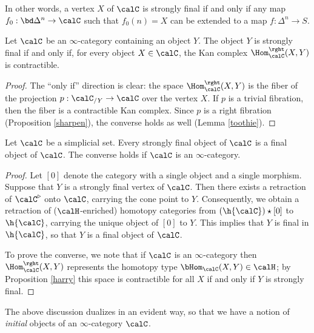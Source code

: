 In other words, a vertex $X$ of $\calC$ is strongly final if and only if any
map $f_0: \bd \Delta^n \rightarrow \calC$ such that
$f_0(n) = X$ can be extended to a map $f: \Delta^n \rightarrow S$.

\begin{proposition}\label{harry}
Let $\calC$ be an $\infty$-category containing an object $Y$. The object
$Y$ is strongly final if and only if, for every object $X \in \calC$, the Kan
complex $\Hom^{\rght}_{\calC}(X,Y)$ is contractible.
\end{proposition}

\begin{proof}
The ``only if'' direction is clear: the space
$\Hom^{\rght}_{\calC}(X,Y)$ is the fiber of the projection $p: \calC_{/Y}
\rightarrow \calC$ over the vertex $X$. If $p$ is a trivial
fibration, then the fiber is a contractible Kan complex. Since $p$
is a right fibration (Proposition \ref{sharpen}), the converse holds as well (Lemma \ref{toothie}).
\end{proof}

\begin{corollary}
Let $\calC$ be a simplicial set. Every strongly final object of $\calC$ is a final object of $\calC$. The converse holds if $\calC$ is an $\infty$-category.
\end{corollary}

\begin{proof}
Let $[0]$ denote the category with a single object and a single morphism.
Suppose that $Y$ is a strongly final vertex of $\calC$. Then there exists a retraction of
$\calC^{\triangleright}$ onto $\calC$, carrying the cone point to $Y$. Consequently, we obtain a retraction of ($\calH$-enriched) homotopy categories from $(\h{\calC}) \star [0]$ to $\h{\calC}$, carrying the unique object of $[0]$ to $Y$. This implies that $Y$ is final in $\h{\calC}$, so that $Y$ is a final object of $\calC$.

To prove the converse, we note that if $\calC$ is an $\infty$-category then $\Hom_{\calC}^{\rght}(X,Y)$ represents the homotopy type $\bHom_{\calC}(X,Y) \in \calH$; by Proposition \ref{harry} this space is contractible for all $X$ if and only if $Y$ is strongly final.
\end{proof}

\begin{remark}
The above discussion dualizes in an evident way, so that we have a notion of {\em initial} objects of an $\infty$-category $\calC$.
\end{remark}

